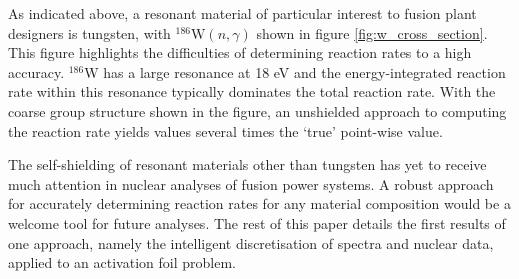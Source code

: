 As indicated above, a resonant material of particular interest to fusion plant designers is tungsten, with $^{186}\mathrm{W}(n,\gamma)$ shown in figure \ref{fig:w_cross_section}. This figure highlights the difficulties of determining reaction rates to a high accuracy. $^{186}$W has a large resonance at 18 eV and the energy-integrated reaction rate within this resonance typically dominates the total reaction rate. With the coarse group structure shown in the figure, an unshielded approach to computing the reaction rate yields values several times the `true' point-wise value.

The self-shielding of resonant materials other than tungsten has yet to receive much attention in nuclear analyses of fusion power systems. A robust approach for accurately determining reaction rates for any material composition would be a welcome tool for future analyses. The rest of this paper details the first results of one approach, namely the intelligent discretisation of spectra and nuclear data, applied to an activation foil problem.

